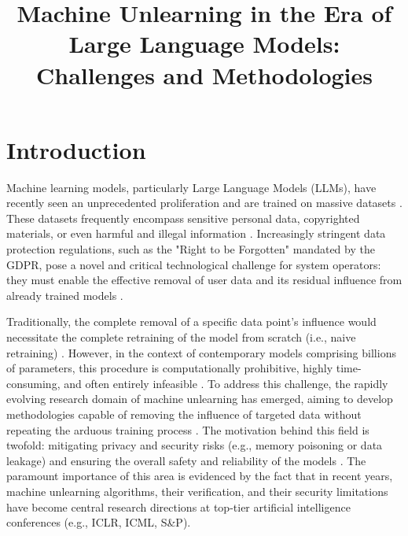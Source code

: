 \documentclass[conference]{IEEEtran}
\begin{document}
\title{Machine Unlearning in the Era of Large Language Models: Challenges and Methodologies}

\author{
}

\maketitle

\section{Introduction}
Machine learning models, particularly Large Language Models (LLMs), have recently seen an unprecedented proliferation and are 
trained on massive datasets \cite{wang2026machineunlearningcomprehensivesurvey}. These datasets frequently encompass sensitive 
personal data, copyrighted materials, or even harmful and illegal information \cite{YAN2025100300, ICLR2025_4556f539}. Increasingly 
stringent data protection regulations, such as the "Right to be Forgotten" mandated by the GDPR, pose a novel and critical 
technological challenge for system operators: they must enable the effective removal of user data and its residual influence 
from already trained models \cite{wang2026machineunlearningcomprehensivesurvey, Liu2025}.

Traditionally, the complete removal of a specific data point's influence would necessitate the complete retraining of the 
model from scratch (i.e., naive retraining) \cite{wang2026machineunlearningcomprehensivesurvey}. However, in the context of 
contemporary models comprising billions of parameters, this procedure is computationally prohibitive, highly time-consuming, 
and often entirely infeasible \cite{7163042, Liu2025}. To address this challenge, the rapidly evolving research domain of machine 
unlearning has emerged, aiming to develop methodologies capable of removing the influence of targeted data without repeating the 
arduous training process \cite{wang2026machineunlearningcomprehensivesurvey, 7163042}. The motivation behind this field is 
twofold: mitigating privacy and security risks (e.g., memory poisoning or data leakage) and ensuring the overall safety and 
reliability of the models \cite{YAN2025100300}. The paramount importance of this area is evidenced by the fact that in 
recent years, machine unlearning algorithms, their verification, and their security limitations have become central 
research directions at top-tier artificial intelligence conferences (e.g., ICLR, ICML, S\&P).
\end{document}
